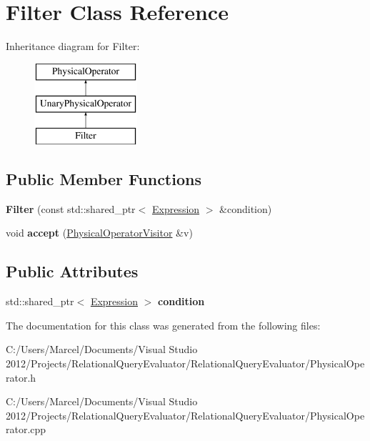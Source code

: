 \hypertarget{class_filter}{\section{Filter Class Reference}
\label{class_filter}
}
Inheritance diagram for Filter\+:\begin{figure}[H]
\begin{center}
\leavevmode
\includegraphics[height=3.000000cm]{class_filter}
\end{center}
\end{figure}
\subsection*{Public Member Functions}
\begin{DoxyCompactItemize}
\item 
\hypertarget{class_filter_a4e75723e5596f5b77b84a395c7453853}{{\bfseries Filter} (const std\+::shared\+\_\+ptr$<$ \hyperlink{class_expression}{Expression} $>$ \&condition)}\label{class_filter_a4e75723e5596f5b77b84a395c7453853}

\item 
\hypertarget{class_filter_a1df50e05d64ad3b2cc45d2f9e28127c4}{void {\bfseries accept} (\hyperlink{class_physical_operator_visitor}{Physical\+Operator\+Visitor} \&v)}\label{class_filter_a1df50e05d64ad3b2cc45d2f9e28127c4}

\end{DoxyCompactItemize}
\subsection*{Public Attributes}
\begin{DoxyCompactItemize}
\item 
\hypertarget{class_filter_acc551fc888d4b2e9bc36364a3877dbb8}{std\+::shared\+\_\+ptr$<$ \hyperlink{class_expression}{Expression} $>$ {\bfseries condition}}\label{class_filter_acc551fc888d4b2e9bc36364a3877dbb8}

\end{DoxyCompactItemize}


The documentation for this class was generated from the following files\+:\begin{DoxyCompactItemize}
\item 
C\+:/\+Users/\+Marcel/\+Documents/\+Visual Studio 2012/\+Projects/\+Relational\+Query\+Evaluator/\+Relational\+Query\+Evaluator/Physical\+Operator.\+h\item 
C\+:/\+Users/\+Marcel/\+Documents/\+Visual Studio 2012/\+Projects/\+Relational\+Query\+Evaluator/\+Relational\+Query\+Evaluator/Physical\+Operator.\+cpp\end{DoxyCompactItemize}
